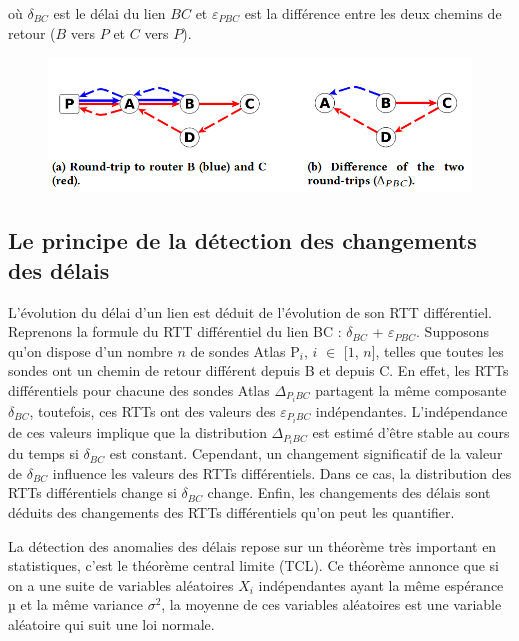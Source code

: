 où $\delta_{BC}$ est le délai du lien $BC$ et $\varepsilon_{PBC}$ est la différence entre les deux chemins de retour ($B$ vers $P$ et $C$ vers $P$). 
\begin{figure}[H]
	\centering
	\includegraphics[width=0.7\linewidth]{illustrations/rtt-differ}
	\caption{}
	\label{fig:rtt-differ}
\end{figure}



\subsection{Le principe de la détection des changements des délais}

L'évolution du délai d'un lien est déduit  de l'évolution de son RTT différentiel. Reprenons la formule du RTT différentiel du lien BC :  $\delta_{BC}$ + $\varepsilon_{PBC}$. Supposons qu'on dispose d'un nombre $n$ de sondes Atlas P$_i$, $i$ $\in$ [$1$, $n$], telles que toutes les sondes ont un chemin de retour différent depuis B et depuis C.  En effet, les RTTs différentiels pour chacune des sondes Atlas $\Delta_{P{_i}BC}$ partagent la même composante $\delta_{BC}$, toutefois, ces RTTs ont des valeurs des  $\varepsilon_{P_{i}BC}$ indépendantes. L'indépendance de ces valeurs implique que la distribution $\Delta_{P_{i}BC}$ est estimé d'être stable au cours du temps si $\delta_{BC}$ est constant. Cependant, un changement significatif de la valeur de $\delta_{BC}$ influence les valeurs des RTTs différentiels. Dans ce cas, la distribution des RTTs différentiels change si $\delta_{BC}$ change. Enfin, les changements des délais sont déduits des changements des RTTs différentiels qu'on peut les quantifier.

La détection des anomalies des délais repose sur un théorème très important en statistiques, c'est le théorème  central limite (TCL). Ce théorème  annonce que si on a une suite de variables aléatoires $X_i$ indépendantes ayant la même espérance $µ$ et la même variance $\sigma^2$, la moyenne de ces variables aléatoires est une variable aléatoire qui suit une loi normale. 

